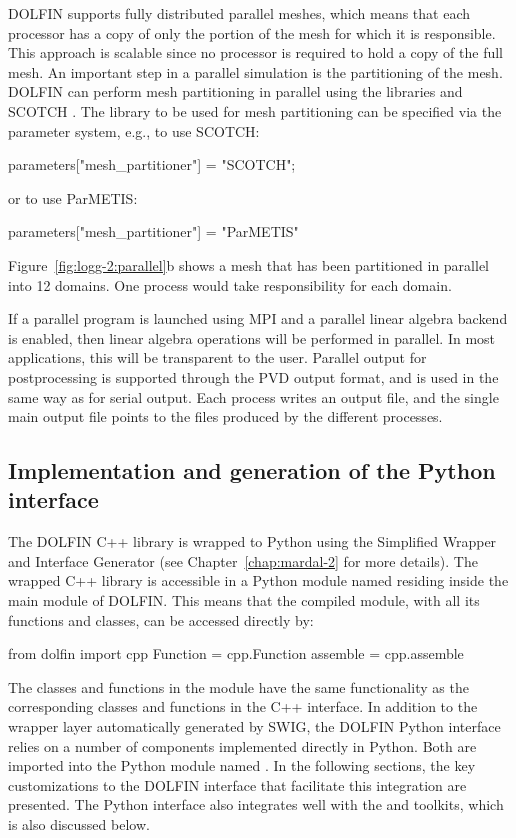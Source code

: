 DOLFIN supports fully distributed parallel meshes, which means that each
processor has a copy of only the portion of the mesh for which it is
responsible. This approach is scalable since no processor is required
to hold a copy of the full mesh.
An important step in a parallel simulation is the partitioning of the
mesh. DOLFIN can perform mesh partitioning in parallel using the libraries
\citet{www:parmetis} and SCOTCH \citep{www:scotch}.  The library to be
used for mesh partitioning can be specified via the parameter system,
e.g., to use SCOTCH:
\begin{c++}
parameters["mesh_partitioner"] = "SCOTCH";
\end{c++}
or to use ParMETIS:
\begin{python}
parameters["mesh_partitioner"] = "ParMETIS"
\end{python}
Figure~\ref{fig:logg-2:parallel}b shows a mesh that has been partitioned
in parallel into 12 domains. One process would take responsibility
for each domain.

If a parallel program is launched using MPI and a parallel linear
algebra backend is enabled, then linear algebra operations will be
performed in parallel. In most applications, this will be transparent
to the user.  Parallel output for postprocessing is supported through
the PVD output format, and is used in the same way as for serial
output. Each process writes an output file, and the single main output
file points to the files produced by the different processes.

\subsection{Implementation and generation of the Python interface}

The DOLFIN C++ library is wrapped to Python using the Simplified
Wrapper and Interface Generator \swig \citep{Beazley2006,www:swig}
(see Chapter~\ref{chap:mardal-2} for more details). The wrapped C++
library is accessible in a Python module named  residing inside the
main  module of DOLFIN. This means that the compiled
module, with all its functions and classes, can be accessed directly
by:
\begin{python}
from dolfin import cpp
Function = cpp.Function
assemble = cpp.assemble
\end{python}
The classes and functions in the  module have the same
functionality as the corresponding classes and functions in the C++
interface. In addition to the wrapper layer automatically generated
by SWIG, the DOLFIN Python interface relies on a number of components
implemented directly in Python. Both are imported into the Python module
named . In the following sections, the key customizations to
the DOLFIN interface that facilitate this integration are presented. The
Python interface also integrates well with the \numpy and \scipy toolkits,
which is also discussed below.

